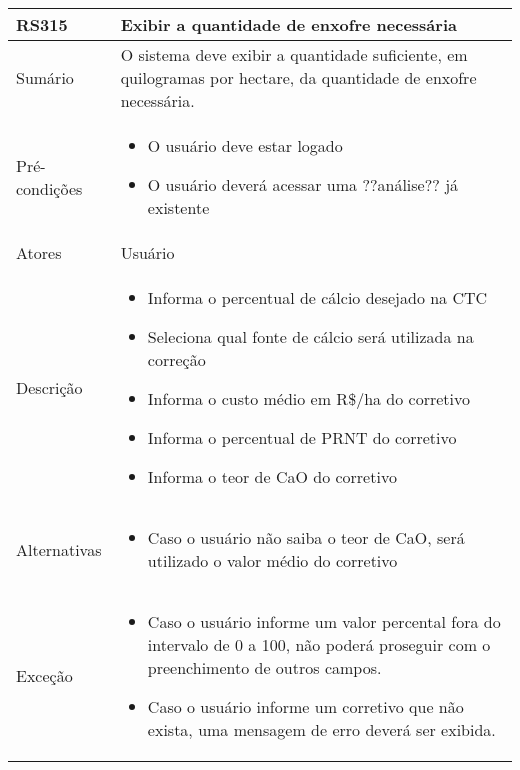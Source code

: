 \begin{quadro}[H]
    \begin{tabular}{|p{3cm}|p{11cm}|}
        \hline
        \textbf{RS315} & \textbf{Exibir a quantidade de enxofre necessária}                                                              \\
        \hline
        Sumário        & O sistema deve exibir a quantidade suficiente, em quilogramas por hectare, da quantidade de enxofre necessária. \\
        \hline
        Pré-condições  & \begin{itemize}
            \item O usuário deve estar logado
            \item O usuário deverá acessar uma ??análise?? já existente
        \end{itemize}                                                                                      \\
        \hline
        Atores         & Usuário                                                                                                         \\
        \hline
        Descrição      &
        \begin{itemize}
            \item Informa o percentual de cálcio desejado na CTC
            \item Seleciona qual fonte de cálcio será utilizada na correção
            \item Informa o custo médio em R\$/ha do corretivo
            \item Informa o percentual de PRNT do corretivo
            \item Informa o teor de CaO do corretivo
        \end{itemize}                                                                                                       \\
        \hline
        Alternativas   &
        \begin{itemize}
            \item Caso o usuário não saiba o teor de CaO, será utilizado o valor médio do corretivo
        \end{itemize}                                                                                                       \\
        \hline
        Exceção        &
        \begin{itemize}
            \item Caso o usuário informe um valor percental fora do intervalo de 0 a 100, não poderá proseguir com o preenchimento de outros campos.
            \item Caso o usuário informe um corretivo que não exista, uma mensagem de erro deverá ser exibida.
        \end{itemize}                                                                                                       \\
        \hline
    \end{tabular}
\end{quadro}

